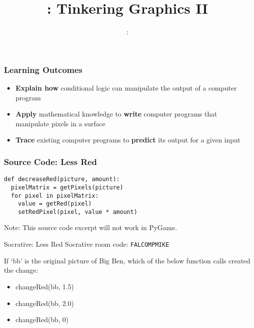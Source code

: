 \usepackage{../../beamerthemeFalmouthGamesAcademy}
\usepackage{multimedia}
\graphicspath{ {../../} }


\usepackage[normalem]{ulem}
\usepackage{wasysym}

\usepackage{pdfpages}

\usetikzlibrary{arrows,automata}







\title{\sessionnumber: Tinkering Graphics II}
\subtitle{\modulecode: \moduletitle}

\frame{\titlepage} 

\begin{frame}
	\frametitle{Learning Outcomes}
	\begin{itemize}
		\item \textbf{Explain how} conditional logic can manipulate the output of a computer program
		\item \textbf{Apply} mathematical knowledge to \textbf{write} computer programs that manipulate pixels in a surface
		\item \textbf{Trace} existing computer programs to \textbf{predict} its output for a given input
	\end{itemize}
\end{frame}

\begin{frame}[fragile]
	\frametitle{Source Code: Less Red}
	
\begin{lstlisting}
def decreaseRed(picture, amount):
  pixelMatrix = getPixels(picture)
  for pixel in pixelMatrix:
    value = getRed(pixel)
    setRedPixel(pixel, value * amount)
\end{lstlisting}

Note: This source code excerpt will not work in PyGame.

\end{frame}


\begin{frame}{Socrative: Less Red}
	Socrative room code: \texttt{FALCOMPMIKE}
	
	\vspace{2em}
	
	If `bb' is the original picture of Big Ben, which of the below function calls created the change:
	
	\begin{itemize}
		\item changeRed(bb, 1.5)
		\item changeRed(bb, 2.0)
		\item changeRed(bb, 0)
	\end{itemize}
\end{frame}

